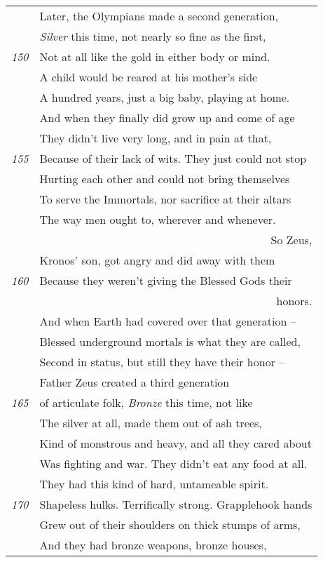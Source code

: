 \begin{tabular}[bht]{rl}
& Later, the Olympians made a second generation, \\
& {\em Silver} this time, not nearly so fine as the first, \\
\tiny{\em 150} & Not at all like the gold in either body or mind. \\
& A child would be reared at his mother's side \\
& A hundred years, just a big baby, playing at home.\\
& And when they finally did grow up and come of age \\
& They didn't live very long, and in pain at that, \\
\tiny{\em 155}& Because of their lack of wits. They just could not stop \\
& Hurting each other and could not bring themselves \\
& To serve the Immortals, nor sacrifice at their altars \\
& The way men ought to, wherever and whenever.\\
  \multicolumn{2}{r}{ So Zeus,} \\
& Kronos' son, got angry and did away with them \\
\tiny{\em 160}& Because they weren't giving the Blessed Gods their\\
  \multicolumn{2}{r}{ honors.} \\
& And when Earth had covered over that generation -- \\
& Blessed underground mortals is what they are called, \\
& Second in status, but still they have their honor -- \\[1ex]
& Father Zeus created a third generation \\
\tiny{\em 165}& of articulate folk, {\em Bronze} this time, not like \\
& The silver at all, made them out of ash trees, \\
& Kind of monstrous and heavy, and all they cared about \\
& Was fighting and war. They didn't eat any food at all. \\
& They had this kind of hard, untameable spirit. \\
\tiny{\em 170} & Shapeless hulks. Terrifically strong. Grapplehook hands \\
& Grew out of their shoulders on thick stumps of arms, \\
& And they had bronze weapons, bronze houses, \\

\end{tabular}
